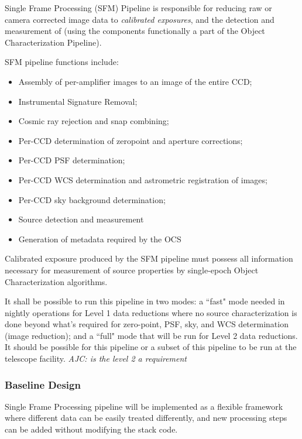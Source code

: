 Single Frame Processing (SFM) Pipeline is responsible for reducing raw
or camera corrected image data to \emph{calibrated exposures}, and the
detection and measurement of \Sources (using the components
functionally a part of the Object Characterization Pipeline).


SFM pipeline functions include:
\begin{itemize}
\item Assembly of per-amplifier images to an image of the entire CCD;
\item Instrumental Signature Removal;
\item Cosmic ray rejection and snap combining;
\item Per-CCD determination of zeropoint and aperture corrections;
\item Per-CCD PSF determination;
\item Per-CCD WCS determination and astrometric registration of images;
\item Per-CCD sky background determination;
\item Source detection and measurement
\item Generation of metadata required by the OCS
\end{itemize}


Calibrated exposure produced by the SFM pipeline must possess all
information necessary for measurement of source properties by
single-epoch Object Characterization algorithms.

It shall be possible to run this pipeline in two modes: a ``fast" mode
needed in nightly operations for Level 1 data reductions where no
source characterization is done beyond what's required for zero-point,
PSF, sky, and WCS determination (image reduction); and a ``full" mode
that will be run for Level 2 data reductions.
It should be possible for this pipeline or a subset of this pipeline
to be run at the telescope facility.
\emph{AJC: is the level 2 a requirement}


\subsubsection{Baseline Design}

Single Frame Processing pipeline will be implemented as a flexible framework where different data can be easily treated differently, and new processing steps can be added without modifying the stack code.
\\

